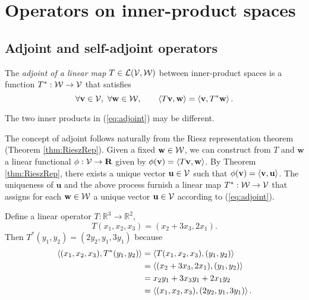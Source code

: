 \section{Operators on inner-product spaces}
\label{sec:oper-inner-prod}

\subsection{Adjoint and self-adjoint operators}

\begin{defn}
  \label{def:adjoint}
  The \emph{adjoint of a linear map}
  \mbox{$T\in {\cal L}({\cal V},{\cal W})$}
  between inner-product spaces is a function
  $T^*:{\cal W}\rightarrow{\cal V}$
  that satisfies
  \begin{equation}
    \label{eq:adjoint}
    \forall \mathbf{v}\in {\cal V},\ \forall \mathbf{w}\in {\cal W},
    \qquad \left\langle T\mathbf{v},\mathbf{w} \right\rangle = \left\langle \mathbf{v},T^*\mathbf{w} \right\rangle.
  \end{equation}
\end{defn}

\begin{rem}
  The two inner products in (\ref{eq:adjoint}) may be different.
\end{rem}

\begin{rem}
  The concept of adjoint follows naturally
  from the Riesz representation theorem (Theorem \ref{thm:RieszRep}).
  Given a fixed $\mathbf{w}\in {\cal W}$,
  we can construct from $T$ and $\mathbf{w}$ a linear functional
  $\phi: {\cal V}\rightarrow \mathbf{R}$
  given by $\phi(\mathbf{v}) = \left\langle T\mathbf{v},\mathbf{w} \right\rangle$.
  By Theorem \ref{thm:RieszRep},
  there exists a unique vector $\mathbf{u}\in{\cal V}$
  such that $\phi(\mathbf{v})=\left\langle \mathbf{v},\mathbf{u} \right\rangle$.
  The uniqueness of $\mathbf{u}$
  and the above process furnish a linear map
  $T^*:{\cal W}\rightarrow{\cal V}$
  that assigns for each $\mathbf{w}\in {\cal W}$
  a unique vector $\mathbf{u}\in {\cal V}$
  according to (\ref{eq:adjoint}).
\end{rem}

\begin{exm}
  Define a linear operator $T:\mathbb{R}^3\rightarrow \mathbb{R}^2$, 
  \begin{displaymath}
    T(x_1,x_2,x_3)=(x_2+3x_3,2x_1).
  \end{displaymath}
  Then $T^*(y_1,y_2)=(2y_2,y_1,3y_1)$ because
  \begin{align*}
    \left\langle (x_1,x_2,x_3), T^*(y_1,y_2) \right\rangle
    &= \left\langle T(x_1,x_2,x_3), (y_1,y_2) \right\rangle
    \\
    &= \left\langle (x_2+3x_3,2x_1), (y_1,y_2) \right\rangle
    \\
    &= x_2y_1+3x_3y_1+2x_1y_2
    \\
    &= \left\langle (x_1,x_2,x_3), (2y_2,y_1,3y_1) \right\rangle.
  \end{align*}
\end{exm}

